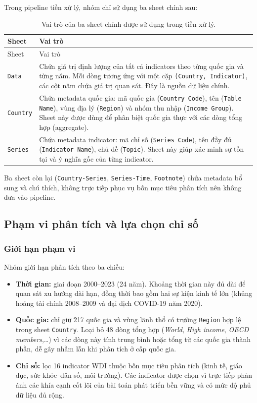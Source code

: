 Trong pipeline tiền xử lý, nhóm chỉ sử dụng ba sheet chính sau:

\begin{longtable}{L{3.2cm}L{10.8cm}}
\caption{Vai trò của ba sheet chính được sử dụng trong tiền xử lý.}
\label{tab:wdi-sheets}\\
\toprule
Sheet & Vai trò \\
\midrule
\endfirsthead
\toprule
Sheet & Vai trò \\
\midrule
\endhead
\texttt{Data} & Chứa giá trị định lượng của tất cả indicators theo từng quốc gia và từng năm. Mỗi dòng tương ứng với một cặp \texttt{(Country, Indicator)}, các cột năm chứa giá trị quan sát. Đây là nguồn dữ liệu chính. \\
\texttt{Country} & Chứa metadata quốc gia: mã quốc gia (\texttt{Country Code}), tên (\texttt{Table Name}), vùng địa lý (\texttt{Region}) và nhóm thu nhập (\texttt{Income Group}). Sheet này được dùng để phân biệt quốc gia thực với các dòng tổng hợp (aggregate). \\
\texttt{Series} & Chứa metadata indicator: mã chỉ số (\texttt{Series Code}), tên đầy đủ (\texttt{Indicator Name}), chủ đề (\texttt{Topic}). Sheet này giúp xác minh sự tồn tại và ý nghĩa gốc của từng indicator. \\
\bottomrule
\end{longtable}

Ba sheet còn lại (\texttt{Country-Series}, \texttt{Series-Time}, \texttt{Footnote}) chứa metadata bổ sung và chú thích, không trực tiếp phục vụ bốn mục tiêu phân tích nên không đưa vào pipeline.

\subsection{Phạm vi phân tích và lựa chọn chỉ số}

\subsubsection{Giới hạn phạm vi}

Nhóm giới hạn phân tích theo ba chiều:

\begin{itemize}
    \item \textbf{Thời gian:} giai đoạn 2000--2023 (24 năm). Khoảng thời gian này đủ dài để quan sát xu hướng dài hạn, đồng thời bao gồm hai sự kiện kinh tế lớn (khủng hoảng tài chính 2008--2009 và đại dịch COVID-19 năm 2020).
    \item \textbf{Quốc gia:} chỉ giữ 217 quốc gia và vùng lãnh thổ có trường \texttt{Region} hợp lệ trong sheet \texttt{Country}. Loại bỏ 48 dòng tổng hợp (\textit{World}, \textit{High income}, \textit{OECD members},\ldots) vì các dòng này tính trung bình hoặc tổng từ các quốc gia thành phần, dễ gây nhầm lẫn khi phân tích ở cấp quốc gia.
    \item \textbf{Chỉ số:} lọc 16 indicator WDI thuộc bốn mục tiêu phân tích (kinh tế, giáo dục, sức khỏe--dân số, môi trường). Các indicator được chọn vì trực tiếp phản ánh các khía cạnh cốt lõi của bài toán phát triển bền vững và có mức độ phủ dữ liệu đủ rộng.
\end{itemize}

